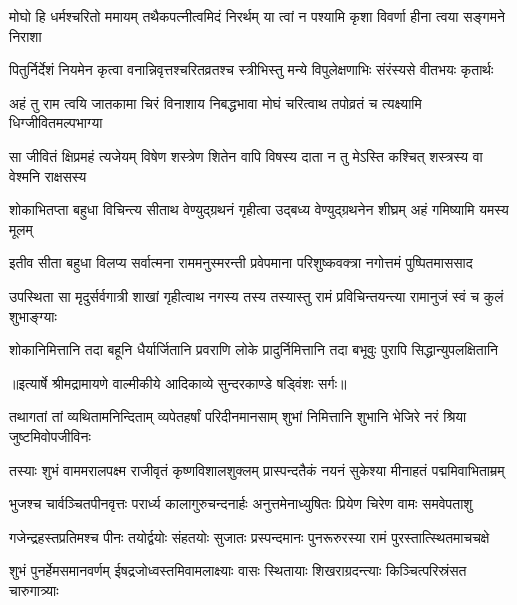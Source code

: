 \fourlineindentedshloka
{मोघो हि धर्मश्चरितो ममायम्}
{तथैकपत्नीत्वमिदं निरर्थम्}
{या त्वां न पश्यामि कृशा विवर्णा}
{हीना त्वया सङ्गमने निराशा} %

\fourlineindentedshloka
{पितुर्निर्देशं नियमेन कृत्वा}
{वनान्निवृत्तश्चरितव्रतश्च}
{स्त्रीभिस्तु मन्ये विपुलेक्षणाभिः}
{संरंस्यसे वीतभयः कृतार्थः} %

\fourlineindentedshloka
{अहं तु राम त्वयि जातकामा}
{चिरं विनाशाय निबद्धभावा}
{मोघं चरित्वाथ तपोव्रतं च}
{त्यक्ष्यामि धिग्जीवितमल्पभाग्या} %

\fourlineindentedshloka
{सा जीवितं क्षिप्रमहं त्यजेयम्}
{विषेण शस्त्रेण शितेन वापि}
{विषस्य दाता न तु मेऽस्ति कश्चित्}
{शस्त्रस्य वा वेश्मनि राक्षसस्य} %

\fourlineindentedshloka
{शोकाभितप्ता बहुधा विचिन्त्य}
{सीताथ वेण्युद्ग्रथनं गृहीत्वा}
{उद्बध्य वेण्युद्ग्रथनेन शीघ्रम्}
{अहं गमिष्यामि यमस्य मूलम्} %

\fourlineindentedshloka
{इतीव सीता बहुधा विलप्य}
{सर्वात्मना राममनुस्मरन्ती}
{प्रवेपमाना परिशुष्कवक्त्रा}
{नगोत्तमं पुष्पितमाससाद} %

\fourlineindentedshloka
{उपस्थिता सा मृदुर्सर्वगात्री}
{शाखां गृहीत्वाथ नगस्य तस्य}
{तस्यास्तु रामं प्रविचिन्तयन्त्या}
{रामानुजं स्वं च कुलं शुभाङ्ग्याः} %

\fourlineindentedshloka
{शोकानिमित्तानि तदा बहूनि}
{धैर्यार्जितानि प्रवराणि लोके}
{प्रादुर्निमित्तानि तदा बभूवुः}
{पुरापि सिद्धान्युपलक्षितानि} %


{॥इत्यार्षे श्रीमद्रामायणे वाल्मीकीये आदिकाव्ये सुन्दरकाण्डे षड्विंशः सर्गः॥}


\fourlineindentedshloka
{तथागतां तां व्यथितामनिन्दिताम्}
{व्यपेतहर्षां परिदीनमानसाम्}
{शुभां निमित्तानि शुभानि भेजिरे}
{नरं श्रिया जुष्टमिवोपजीविनः} %

\fourlineindentedshloka
{तस्याः शुभं वाममरालपक्ष्म}
{राजीवृतं कृष्णविशालशुक्लम्}
{प्रास्पन्दतैकं नयनं सुकेश्या}
{मीनाहतं पद्ममिवाभिताम्रम्} %

\fourlineindentedshloka
{भुजश्च चार्वञ्चितपीनवृत्तः}
{परार्ध्य कालागुरुचन्दनार्हः}
{अनुत्तमेनाध्युषितः प्रियेण}
{चिरेण वामः समवेपताशु} %

\fourlineindentedshloka
{गजेन्द्रहस्तप्रतिमश्च पीनः}
{तयोर्द्वयोः संहतयोः सुजातः}
{प्रस्पन्दमानः पुनरूरुरस्या}
{रामं पुरस्तात्स्थितमाचचक्षे} %

\fourlineindentedshloka
{शुभं पुनर्हेमसमानवर्णम्}
{ईषद्रजोध्वस्तमिवामलाक्ष्याः}
{वासः स्थितायाः शिखराग्रदन्त्याः}
{किञ्चित्परिस्रंसत चारुगात्र्याः} %

